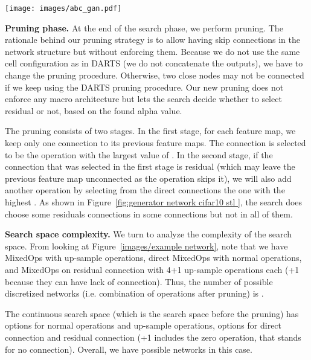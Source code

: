 \documentclass[10pt,twocolumn,letterpaper]{article}
\begin{document}
\begin{figure*}[h!]
        \centering
        \texttt{[image: images/abc\_gan.pdf]}
        \caption{The generators found for: (a) CIFAR-10 (=1); (b) STL (=1); (c) CelebA (=1).}
        \label{fig:generator network cifar10 stl }
\end{figure*}  

\textbf{Pruning phase.} At the end of the search phase, we perform pruning.
The rationale behind our pruning strategy is to allow having skip connections in the network structure but without enforcing them. Because we do not use the same cell configuration as in DARTS (we do not concatenate the outputs), we have to change the pruning procedure. Otherwise, two close nodes may not be connected if we keep using the DARTS pruning procedure. Our new pruning does not enforce any macro architecture but lets the search decide whether to select residual or not, based on the found alpha value. 

The pruning consists of two stages. In the first stage, for each feature map, we keep only one connection to its previous feature maps. The connection is selected to be the operation with the largest value of . In the second stage, if the connection that was selected in the first stage is residual (which may leave the previous feature map unconnected as the operation skips it), we will also add another operation by selecting from the direct connections the one with the highest . 
As shown in Figure~\ref{fig:generator network cifar10 stl }, the search does choose some residuals connections in some connections but not in all of them.






\textbf{Search space complexity.} We turn to analyze the complexity of the search space. 
From looking at Figure~\ref{images/example network}, note that we have  MixedOps with  up-sample operations,  direct MixedOps with  normal operations, and  MixedOps on residual connection with 4+1 up-sample operations each (+1 because they can have lack of connection).
Thus, the number of possible discretized networks (i.e. combination of operations after pruning) is   .

The continuous search space (which is the search space before the pruning) has  options for normal operations and up-sample operations,  options for direct connection and  residual connection (+1 includes the zero operation, that stands for no connection).
Overall, we have  possible networks in this case.
\end{document}
